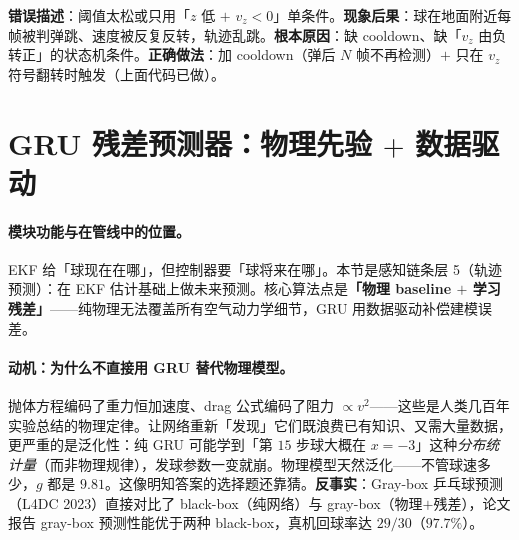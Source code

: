 \begin{pitfall}
\textbf{错误描述}：阈值太松或只用「$z$ 低 $+$ $v_z<0$」单条件。\textbf{现象后果}：球在地面附近每帧被判弹跳、速度被反复反转，轨迹乱跳。\textbf{根本原因}：缺 cooldown、缺「$v_z$ 由负转正」的状态机条件。\textbf{正确做法}：加 cooldown（弹后 $N$ 帧不再检测）$+$ 只在 $v_z$ 符号翻转时触发（上面代码已做）。
\end{pitfall}

\begin{practice}[本节动手任务]
\end{practice}

\section{GRU 残差预测器：\texorpdfstring{物理先验 $+$ 数据驱动}{物理先验 + 数据驱动}}
\label{sec:rlmc-perc-gru}

\paragraph{模块功能与在管线中的位置。}EKF 给「球现在在哪」，但控制器要「球将来在哪」。本节是感知链条层 5（轨迹预测）：在 EKF 估计基础上做未来预测。核心算法点是\textbf{「物理 baseline $+$ 学习残差」}——纯物理无法覆盖所有空气动力学细节，GRU 用数据驱动补偿建模误差。

\paragraph{动机：为什么不直接用 GRU 替代物理模型。}抛体方程编码了重力恒加速度、drag 公式编码了阻力 $\propto v^2$——这些是人类几百年实验总结的物理定律。让网络重新「发现」它们既浪费已有知识、又需大量数据，更严重的是泛化性：纯 GRU 可能学到「第 $15$ 步球大概在 $x=-3$」这种\emph{分布统计量}（而非物理规律），发球参数一变就崩。物理模型天然泛化——不管球速多少，$g$ 都是 $9.81$。这像明知答案的选择题还靠猜。\textbf{反事实}：Gray-box 乒乓球预测（L4DC 2023）直接对比了 black-box（纯网络）与 gray-box（物理$+$残差），论文报告 gray-box 预测性能优于两种 black-box，真机回球率达 $29/30$（$97.7\%$）\cite{achterhold2023graybox}。


